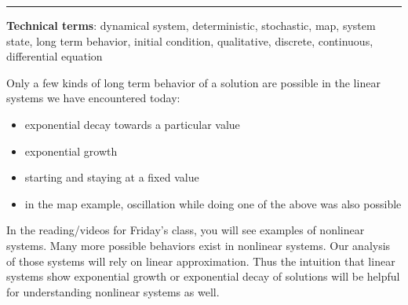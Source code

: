 \documentclass[12pt,letterpaper,noanswers]{exam}
\begin{document}
\vspace{0.2cm}
\hrule
\vspace{0.2cm}

\begin{tcolorbox}
\textbf{Technical terms}:  dynamical system, deterministic, stochastic, map, system state, long term behavior, initial condition, qualitative, discrete, continuous, differential equation
\end{tcolorbox}

\eject

\begin{tcolorbox}
Only a few kinds of long term behavior of a solution are possible in the linear systems we have encountered today:
\begin{itemize}
\itemsep0em
    \item exponential decay towards a particular value
    \item exponential growth
    \item starting and staying at a fixed value
    \item in the map example, oscillation while doing one of the above was also possible
\end{itemize}

In the reading/videos for Friday's class, you will see examples of nonlinear systems.  Many more possible behaviors exist in nonlinear systems.  Our analysis of those systems will rely on linear approximation.  Thus the intuition that linear systems show exponential growth or exponential decay of solutions will be helpful for understanding nonlinear systems as well.

\end{tcolorbox}
\end{document}
